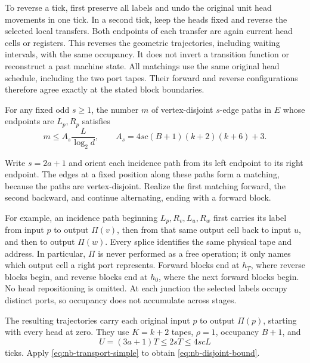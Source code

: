 \begin{informalproof}
To reverse a tick, first preserve all labels and undo the original unit
head movements in one tick.  In a second tick, keep the heads fixed and
reverse the selected local transfers.  Both endpoints of each transfer
are again current head cells or registers.  This reverses the geometric
trajectories, including waiting intervals, with the same occupancy.
It does not invert a transition function or reconstruct a past machine
state.  All matchings use the same original head schedule, including
the two port tapes.  Their forward and reverse configurations therefore
agree exactly at the stated block boundaries.
\end{informalproof}

\begin{lemma}\label{lem:nb-disjoint}
\notformalized
For any fixed odd $s\ge1$, the number $m$ of vertex-disjoint $s$-edge
paths in $E$ whose endpoints are $L_p,R_p$ satisfies
\begin{equation}\label{eq:nb-disjoint-bound}
 m\le A_s\frac{L}{\log_2d},\qquad
 A_s=4sc(B+1)(k+2)(k+6)+3.
\end{equation}
\end{lemma}

\begin{informalproof}
Write $s=2a+1$ and orient each incidence path from its left endpoint
to its right endpoint.  The edges at a fixed position along these
paths form a matching, because the paths are vertex-disjoint.  Realize
the first matching forward, the second backward, and continue
alternating, ending with a forward block.

For example, an incidence path beginning
$L_p,R_v,L_u,R_w$ first carries its label from input $p$ to output
$\Pi(v)$, then from that same output cell back to input $u$, and
then to output $\Pi(w)$.  Every splice identifies the same physical
tape and address.  In particular, $\Pi$ is never performed as a free
operation; it only names which output cell a right port represents.
Forward blocks end at $h_T$, where reverse blocks begin, and reverse
blocks end at $h_0$, where the next forward blocks begin.  No head
repositioning is omitted.  At each junction the selected labels occupy
distinct ports, so occupancy does not accumulate across stages.

The resulting trajectories carry each original input $p$ to output
$\Pi(p)$, starting with every head at zero.  They use $K=k+2$ tapes,
$\rho=1$, occupancy $B+1$, and
\[
 U=(3a+1)T\le2sT\le4scL
\]
ticks.  Apply \eqref{eq:nb-transport-simple} to obtain
\eqref{eq:nb-disjoint-bound}.
\end{informalproof}

